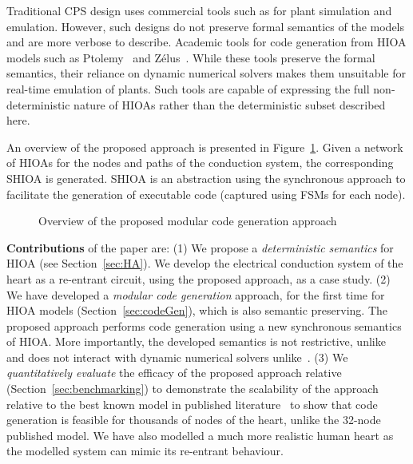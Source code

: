 {  Traditional \ac{CPS} design uses commercial tools such as \simulink
  for plant simulation and emulation.  However, such designs do not
  preserve formal semantics of the models and are more verbose to
  describe.  Academic tools for code generation from \ac{HIOA} models such
  as Ptolemy~\cite{ptolemaeus2014system} and
  Z\'{e}lus~\cite{bourke13zelus}.  While these tools preserve the formal
  semantics, their reliance on dynamic numerical solvers makes them
  unsuitable for real-time emulation of plants.  Such tools are capable
  of expressing the full non-deterministic nature of \acp{HIOA} rather
  than the deterministic subset described here.}

   
An overview of the proposed approach is presented in
Figure~\ref{fig:overview}. Given a network of \acp{HIOA} for the nodes
and paths of the conduction system, the corresponding \ac{SHIOA} is
generated. \ac{SHIOA} is an abstraction using the synchronous approach
to facilitate the generation of executable code (captured using
\acp{FSM} for each node).

\begin{figure}[bthp]
  \centering
  \scalebox{0.7}{
    
  }
  \caption{Overview of the proposed modular 
    code generation approach \label{fig:overview}}
\end{figure}
      
\textbf{Contributions} of the paper are: (1) We propose a
\emph{{\color{red} deterministic} semantics} for \acf{HIOA} (see
Section~\ref{sec:HA}).  We develop the electrical conduction system of
the heart as a re-entrant circuit, using the proposed approach, as a
case study.  (2) We have developed a \emph{modular code generation}
approach, for the first time for \ac{HIOA} models
(Section~\ref{sec:codeGen}), which is also semantic preserving.  The
proposed approach performs code generation using a new synchronous
semantics~\cite{benveniste03} of \ac{HIOA}. More importantly, the
developed semantics is not restrictive, unlike~\cite{alur2003generating,
  kim2003modular} and does not interact with dynamic numerical solvers
unlike~\cite{ptolemaeus2014system, bourke13zelus}.  (3) We
\emph{quantitatively evaluate} the efficacy of the proposed approach
relative \simulink (Section~\ref{sec:benchmarking}) to demonstrate the
scalability of the approach relative to the best known model in
published literature~\cite{chen14} to show that code generation is
feasible for thousands of nodes of the heart, unlike the 32-node
published model. We have also modelled a much more realistic human heart
as the modelled system can mimic its re-entrant behaviour.
 

 

